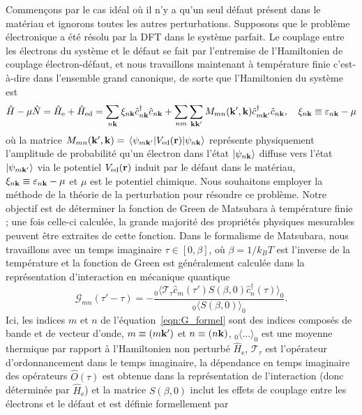 Commençons par le cas idéal où il n'y a qu'un seul défaut présent dans le matériau et ignorons toutes les autres perturbations. Supposons que le problème électronique a été résolu par la DFT dans le système parfait. Le couplage entre les électrons du système et le défaut se fait par l'entremise de l'Hamiltonien de couplage électron-défaut, et nous travaillons maintenant à température finie c'est-à-dire dans l'ensemble grand canonique, de sorte que l'Hamiltonien du système est
\begin{equation}
    \hat{H}-\mu\hat{N} = \hat{H}_\text{e}+\hat{H}_\text{ed} = \sum_{n\mathbf{k}}\xi_{n\mathbf{k}}\hat{c}^\dag_{n\mathbf{k}}\hat{c}_{n\mathbf{k}}+\sum_{nm}\sum_{\mathbf{k}\mathbf{k}'}M_{mn}(\mathbf{k}',\mathbf{k})\hat{c}^\dag_{m\mathbf{k}'}\hat{c}_{n\mathbf{k}},\quad\xi_{n\mathbf{k}} \equiv \varepsilon_{n\mathbf{k}}-\mu
\end{equation}
où la matrice $M_{mn}(\kv',\kv)=\matrixel{\psi_{m\kv'}}{V_\text{ed}(\rv)}{\psi_{n\kv}}$ représente physiquement l'amplitude de probabilité qu'un électron dans l'état $\ket{\psi_{n\mathbf{k}}}$ diffuse vers l'état $\ket{\psi_{m\mathbf{k}'}}$ via le potentiel $V_\text{ed}(\mathbf{r})$ induit par le défaut dans le matériau, $\xi_{n\mathbf{k}}\equiv\varepsilon_{ n\mathbf{k}}-\mu$ et $\mu$ est le potentiel chimique. Nous souhaitons employer la méthode de la théorie de la perturbation pour résoudre ce problème. Notre objectif est de déterminer la fonction de Green de Matsubara à température finie ; une fois celle-ci calculée, la grande majorité des propriétés physiques mesurables peuvent être extraites de cette fonction. Dans le formalisme de Matsubara, nous travaillons avec un temps imaginaire $\tau\in[0,\beta]$, où $\beta=1/k_BT$ est l'inverse de la température et la fonction de Green est généralement calculée dans la représentation d'interaction en mécanique quantique~\cite{mahanManyParticlePhysics2000}
\begin{equation}
    \mathcal{G}_{mn}(\tau'-\tau) = -\frac{{}_0\langle\mathcal{T}_\tau\hat{c}_m(\tau')S(\beta,0)\hat{c}
    _n^\dag(\tau)\rangle_0}{{}_0\langle S(\beta,0)\rangle_0}.\label{eqn:G_formel}
\end{equation}
Ici, les indices $m$ et $n$ de l'équation~\eqref{eqn:G_formel} sont des indices composés de bande et de vecteur d'onde, $m\equiv(m\mathbf{k}')$ et $n\equiv(n\mathbf{k})$, ${}_0\langle\dots\rangle_0$ est une moyenne thermique par rapport à l'Hamiltonien non perturbé $\hat{H}_\text{e}$, $\mathcal{T}_\tau$ est l'opérateur d'ordonnancement dans le temps imaginaire, la dépendance en temps imaginaire des opérateurs $\hat{O}(\tau)$ est obtenue dans la représentation de l'interaction (donc déterminée par $\hat{H}_\text{e}$) et la matrice $S(\beta, 0)$ inclut les effets de couplage entre les électrons et le défaut et est définie formellement par
